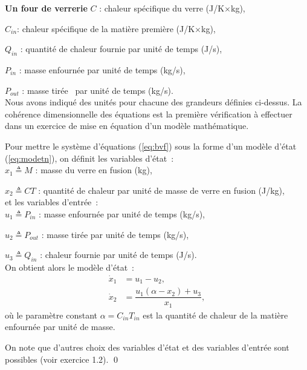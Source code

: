 \begin{exemple}{\bf  Un four de verrerie}
$C$ : chaleur spécifique du verre (J/K$\times$kg),

$C_{in}$: chaleur spécifique de la matière première (J/K$\times$kg),

$Q_{in}$ : quantité de chaleur fournie par unité de temps (J/s),

$P_{in}$ : masse enfournée par unité de temps (kg/s),

$P_{out}$ : masse \og tirée \fg~par unité de temps (kg/s).\\

\noindent Nous avons indiqué des unités pour chacune des grandeurs définies ci-dessus. La cohérence dimensionnelle des équations est la première vérification à effectuer dans un exercice de mise en équation d'un modèle mathématique.

Pour mettre le système d'équations (\ref{eq:bvf}) sous la forme d'un modèle d'état (\ref{eq:modetn}), on définit les variables d'état~:\\

$x_1 \triangleq M$ : masse du verre en fusion (kg),

$x_2 \triangleq C T$ : quantité de chaleur par unité de masse de verre en fusion (J/kg),\\

\noindent et les variables d'entrée~:\\

$u_1 \triangleq P_{in}$ : masse enfournée par unité de temps (kg/s),

$u_2 \triangleq P_{out}$ : masse tirée par unité de temps (kg/s),

$u_3 \triangleq Q_{in}$ : chaleur fournie par unité de temps (J/s).\\

\noindent On obtient alors le modèle d'état~:
\begin{equation} \begin{split} \label{four1}
\dot x_1 &= u_1 - u_2, \\
\dot x_2 &= \dfrac {u_1(\alpha - x_2) + u_3}{x_1},
\end{split} \end{equation}
où le paramètre constant $\alpha = C_{in}T_{in}$ est la quantité de chaleur de la matière enfournée par unité de masse.

On note que d'autres choix des variables d'état et des variables d'entrée sont possibles (voir exercice 1.2). \qed
\end{exemple}  
\vv

